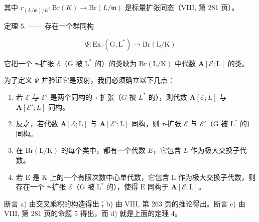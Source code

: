 其中 \(r_{(L/\mathfrak{m})/K} : \mathrm{Br}(K) \to \mathrm{Br}(L/\mathfrak{m})\) 是标量扩张同态（VIII, 第 281 页）。

定理 5. —— 存在一个群同构

\[
\Psi : \mathrm{Ex} _ {\tau} (\mathrm{G}, \mathrm{L} ^ {*}) \longrightarrow \mathrm{Br} (\mathrm{L} / \mathrm{K})
\]

它把一个 \(\tau\)-扩张 \(\mathcal{E}\)（G 被 \(\mathrm{L}^*\) 的）的类映为 \(\mathrm{Br}(\mathrm{L} / \mathrm{K})\) 中代数 \(\mathbf{A}[\mathcal{E};\mathrm{L}]\) 的类。

为了定义 \(\Psi\) 并验证它是双射，我们必须确立以下几点：

\begin{enumerate}
\def\labelenumi{\alph{enumi})}
\item
  若 \(\mathcal{E}\) 与 \(\mathcal{E}'\) 是两个同构的 \(\tau\)-扩张（\(G\) 被 \(L^*\) 的），则代数 \(\mathbf{A}[\mathcal{E}; L]\) 与 \(\mathbf{A}[\mathcal{E}'; L]\) 同构。
\item
  反之，若代数 \(\mathbf{A}[\mathcal{E};\mathrm{L}]\) 与 \(\mathbf{A}[\mathcal{E}';\mathrm{L}]\) 同构，则 \(\tau\)-扩张 \(\mathcal{E}\) 与 \(\mathcal{E}'\)（\(\mathrm{G}\) 被 \(\mathrm{L}^*\) 的）同构。
\item
  在 \(\mathrm{Br(L / K)}\) 的每个类中，都有一个代数 \(E\)，它包含 \(L\) 作为极大交换子代数。
\item
  若 \(\mathrm{E}\) 是 \(\mathrm{K}\) 上的一个有限次数中心单代数，它包含 \(\mathrm{L}\) 作为极大交换子代数，则存在一个 \(\tau\)-扩张 \(\mathcal{E}\)（\(\mathrm{G}\) 被 \(\mathrm{L}^*\) 的），使得 \(\mathrm{E}\) 同构于 \(\mathbf{A}[\mathcal{E};\mathrm{L}]\)。
\end{enumerate}

断言 a) 由交叉乘积的构造得出；b) 由 VIII, 第 263 页的推论得出。断言 c) 由 VIII, 第 281 页的命题 5 得出，而 d) 就是上面的定理 4。


